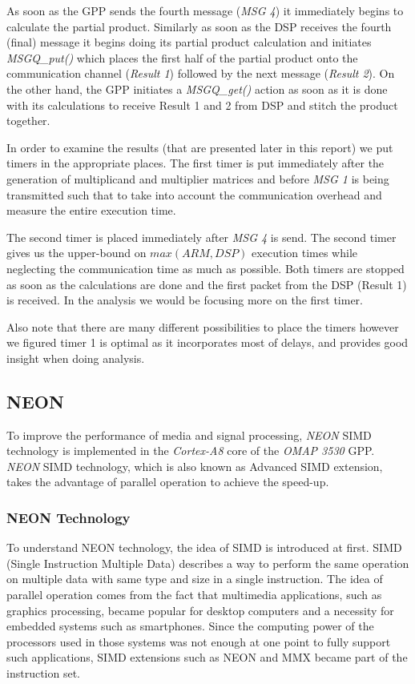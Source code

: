 As soon as the GPP sends the fourth message (\emph{MSG 4}) it immediately begins to calculate the partial product. Similarly as soon as the DSP receives the fourth (final) message it begins doing its partial product calculation and initiates \emph{MSGQ\_put()} which places the first half of the partial product onto the communication channel (\emph{Result 1}) followed by the next message (\emph{Result 2}). On the other hand, the GPP initiates a \emph{MSGQ\_get()} action as soon as it is done with its calculations to receive Result 1 and 2 from DSP and stitch the product together.

In order to examine the results (that are presented later in this report) we put timers in the appropriate places. The first timer is put immediately after the generation of multiplicand and multiplier matrices and before \emph{MSG 1} is being transmitted such that to take into account the communication overhead and measure the entire execution time.

The second timer is placed immediately after \emph{MSG 4} is send. The second timer gives us the upper-bound on $max(ARM, DSP)$ execution times while neglecting the communication time as much as possible. Both timers are stopped as soon as the calculations are done and the first packet from the DSP (Result 1) is received. In the analysis we would be focusing more on the first timer.

Also note that there are many different possibilities to place the timers however we figured timer 1 is optimal as it incorporates most of delays, and provides good insight when doing analysis.

\subsection{NEON}
To improve the performance of media and signal processing, 
\emph{NEON} SIMD technology is implemented in the \emph{Cortex-A8} core of the \emph{OMAP 3530} GPP. 
\emph{NEON} SIMD technology, which is also known as Advanced SIMD extension, 
takes the advantage of parallel operation to achieve the speed-up.
\subsubsection{NEON Technology} 
To understand NEON technology, the idea of SIMD is introduced at first. 
SIMD (Single Instruction Multiple Data) describes a way to perform the same operation on multiple data with same type and size in a single instruction. 
The idea of parallel operation comes from the fact that multimedia applications, such as graphics processing, became popular for desktop computers and a necessity for embedded systems such as smartphones. Since the computing power of the processors used in those systems was not enough at one point to fully support such applications, SIMD extensions such as NEON and MMX became part of the instruction set.

